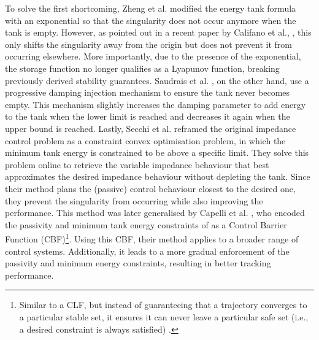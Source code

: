 To solve the first shortcoming, Zheng et al. \cite{zhengTimeVaryingImpedanceControl2018} modified the energy tank formula with an exponential so that the singularity does not occur anymore when the tank is empty. However, as pointed out in a recent paper by Califano et al., \cite{califanoUseEnergyTanks2023}, this only shifts the singularity away from the origin but does not prevent it from occurring elsewhere. More importantly, due to the presence of the exponential, the storage function no longer qualifies as a Lyapunov function, breaking previously derived stability guarantees. Saudrais et al. \cite{saudraisRateModeBilateral2021}, on the other hand, use a progressive damping injection mechanism to ensure the tank never becomes empty. This mechanism slightly increases the damping parameter to add energy to the tank when the lower limit is reached and decreases it again when the upper bound is reached. Lastly, Secchi et al. \cite{secchiEnergyOptimizationRobust2019} reframed the original impedance control problem as a constraint convex optimisation problem, in which the minimum tank energy is constrained to be above a specific limit. They solve this problem online to retrieve the variable impedance behaviour that best approximates the desired impedance behaviour without depleting the tank. Since their method plans the (passive) control behaviour closest to the desired one, they prevent the singularity from occurring while also improving the performance. This method was later generalised by Capelli et al. \cite{capelliPassivityControlBarrier2022}, who encoded the passivity and minimum tank energy constraints of \cite{secchiEnergyOptimizationRobust2019} as a Control Barrier Function (CBF)\footnote{Similar to a CLF, but instead of guaranteeing that a trajectory converges to a particular stable set, it ensures it can never leave a particular safe set (i.e., a desired constraint is always satisfied)  \cite{amesControlBarrierFunctions2019}.}. Using this CBF, their method applies to a broader range of control systems. Additionally, it leads to a more gradual enforcement of the passivity and minimum energy constraints, resulting in better tracking performance.

